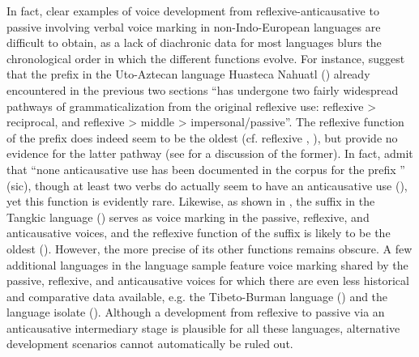 In fact, clear examples of voice development from reflexive-anticausative to passive involving verbal voice marking in non-Indo-European languages are difficult to obtain, as a lack of diachronic data for most languages blurs the chronological order in which the different functions evolve. For instance, \cite[102]{llanes:al:2017} suggest that the prefix  in the Uto-Aztecan language Huasteca Nahuatl () already encountered in the previous two sections “has undergone two fairly widespread pathways of grammaticalization from the original reflexive use: reflexive > reciprocal, and reflexive > middle > impersonal/passive”. The reflexive function of the prefix does indeed seem to be the oldest (cf.  reflexive , \citealt{langacker:1976}), but \cite{llanes:al:2017} provide no evidence for the latter pathway (see  for a discussion of the former). In fact, \cite[102]{llanes:al:2017} admit that “none anticausative use has been documented in the corpus for the prefix ” (sic), though at least two verbs do actually seem to have an anticausative use (), yet this function is evidently rare. Likewise, as shown in , the suffix  in the Tangkic language  () serves as voice marking in the passive, reflexive, and anticausative voices, and the reflexive function of the suffix is likely to be the oldest (). However, the more precise  of its other functions remains obscure. A few additional languages in the language sample feature voice marking shared by the passive, reflexive, and anticausative voices for which there are even less historical and comparative data available, e.g. the Tibeto-Burman language  () and the language isolate  (). Although a development from reflexive to passive via an anticausative intermediary stage is plausible for all these languages, alternative development scenarios cannot automatically be ruled out.

